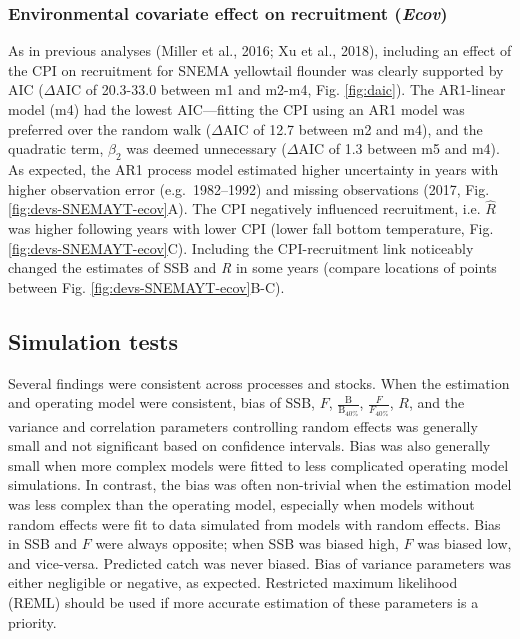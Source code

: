 \documentclass[]{article}
\begin{document}
\hypertarget{environmental-covariate-effect-on-recruitment-ecov}{%
\subsubsection{\texorpdfstring{Environmental covariate effect on
recruitment
(\emph{Ecov})}{Environmental covariate effect on recruitment (Ecov)}}\label{environmental-covariate-effect-on-recruitment-ecov}}

As in previous analyses (Miller et al., 2016; Xu et al., 2018),
including an effect of the CPI on recruitment for SNEMA yellowtail
flounder was clearly supported by AIC (\(\Delta \text{AIC}\) of
20.3-33.0 between m1 and m2-m4, Fig. \ref{fig:daic}). The AR1-linear
model (m4) had the lowest AIC---fitting the CPI using an AR1 model was
preferred over the random walk (\(\Delta \text{AIC}\) of 12.7 between m2
and m4), and the quadratic term, \(\beta_2\) was deemed unnecessary
(\(\Delta \text{AIC}\) of 1.3 between m5 and m4). As expected, the AR1
process model estimated higher uncertainty in years with higher
observation error (e.g.~1982--1992) and missing observations (2017, Fig.
\ref{fig:devs-SNEMAYT-ecov}A). The CPI negatively influenced
recruitment, i.e. \(\hat{R}\) was higher following years with lower CPI
(lower fall bottom temperature, Fig. \ref{fig:devs-SNEMAYT-ecov}C).
Including the CPI-recruitment link noticeably changed the estimates of
SSB and \emph{R} in some years (compare locations of points between Fig.
\ref{fig:devs-SNEMAYT-ecov}B-C).

\hypertarget{simulation-tests-1}{%
\subsection{Simulation tests}\label{simulation-tests-1}}

Several findings were consistent across processes and stocks. When the
estimation and operating model were consistent, bias of SSB, \(F\),
\(\frac{\text{B}}{\text{B}_{40\%}}\), \(\frac{F}{F_{40\%}}\), \(R\), and
the variance and correlation parameters controlling random effects was
generally small and not significant based on confidence intervals. Bias
was also generally small when more complex models were fitted to less
complicated operating model simulations. In contrast, the bias was often
non-trivial when the estimation model was less complex than the
operating model, especially when models without random effects were fit
to data simulated from models with random effects. Bias in SSB and \(F\)
were always opposite; when SSB was biased high, \(F\) was biased low,
and vice-versa. Predicted catch was never biased. Bias of variance
parameters was either negligible or negative, as expected. Restricted
maximum likelihood (REML) should be used if more accurate estimation of
these parameters is a priority.
\end{document}
